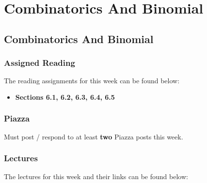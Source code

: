 \clearpage

\renewcommand{\ChapTitle}{Combinatorics And Binomial}
\renewcommand{\SectionTitle}{Combinatorics And Binomial}

\chapter{\ChapTitle}
\section{\SectionTitle}

\subsection{Assigned Reading}

The reading assignments for this week can be found below:

\begin{itemize}
    \item \textbf{Sections 6.1, 6.2, 6.3, 6.4, 6.5}
\end{itemize}

\subsection{Piazza}

Must post / respond to at least \textbf{two} Piazza posts this week.  

\subsection{Lectures}

The lectures for this week and their links can be found below:

